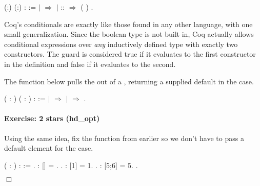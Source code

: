 \documentclass[12pt]{report}
\begin{document}
\begin{coqdoccode}
\coqdocemptyline
\coqdocnoindent
{}  (:) (:) :  :=\coqdoceol
\coqdocindent{1.00em}
  \coqdoceol
\coqdocindent{1.00em}
\ensuremath{|}  \ensuremath{\Rightarrow}  \coqdoceol
\coqdocindent{1.00em}
\ensuremath{|}  ::  \ensuremath{\Rightarrow}          ( ) \coqdoceol
\coqdocindent{1.00em}
.\coqdoceol
\coqdocemptyline
\end{coqdoccode}
Coq's conditionals are exactly like those found in any other
    language, with one small generalization.  Since the boolean type
    is not built in, Coq actually allows conditional expressions over
    \textit{any} inductively defined type with exactly two constructors.  The
    guard is considered true if it evaluates to the first constructor
    in the  definition and false if it evaluates to the
    second. 

 The function below pulls the  out of a , returning
    a supplied default in the  case. \begin{coqdoccode}
\coqdocemptyline
\coqdocnoindent
{}  ( : ) ( : ) :  :=\coqdoceol
\coqdocindent{1.00em}
  \coqdoceol
\coqdocindent{1.00em}
\ensuremath{|}   \ensuremath{\Rightarrow} \coqdoceol
\coqdocindent{1.00em}
\ensuremath{|}  \ensuremath{\Rightarrow} \coqdoceol
\coqdocindent{1.00em}
.\coqdoceol
\coqdocemptyline
\end{coqdoccode}
\paragraph{Exercise: 2 stars (hd\_opt)}

 Using the same idea, fix the  function from earlier so we don't
   have to pass a default element for the  case.  \begin{coqdoccode}
\coqdocemptyline
\coqdocnoindent
{}  ( : ) :  :=\coqdoceol
\coqdocindent{1.00em}
 .\coqdoceol
\coqdocemptyline
\coqdocnoindent
{}  :  [] = .\coqdoceol
 .\coqdoceol
\coqdocemptyline
\coqdocnoindent
{}  :  [1] =  1.\coqdoceol
 .\coqdoceol
\coqdocemptyline
\coqdocnoindent
{}  :  [5;6] =  5.\coqdoceol
 .\coqdoceol
\end{coqdoccode}
\ensuremath{\Box} 
\end{document}
